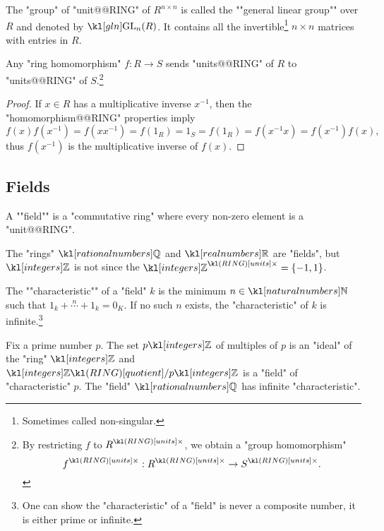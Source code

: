 \documentclass[main.tex]{subfiles}
\begin{document}
\begin{exmp}
	\AP The "group" of "unit@@RING" of $R^{n\times n}$ is called the ""general linear group"" over $R$ and denoted by $\gln(R)$. It contains all the invertible\footnote{Sometimes called non-singular.} $n\times n$ matrices with entries in $R$.
\end{exmp}
\begin{prop}
	Any "ring homomorphism" $f: R \rightarrow S$ sends "units@@RING" of $R$ to "units@@RING" of $S$.\footnote{By restricting $f$ to $\units{R}$, we obtain a "group homomorphism" \[\units{f}: \units{R} \rightarrow \units{S}.\]}
\end{prop}
\begin{proof}
	If $x \in R$ has a multiplicative inverse $x^{-1}$, then the "homomorphism@@RING" properties imply
	\[f(x)f(x^{-1}) = f(xx^{-1}) = f(1_R) = 1_S = f(1_R) = f(x^{-1}x) = f(x^{-1})f(x),\]
	thus $f(x^{-1})$ is the multiplicative inverse of $f(x)$.
\end{proof}
\subsection{Fields}
\begin{defn}[Field]
	\AP A ""field"" is a "commutative ring" where every non-zero element is a "unit@@RING".
\end{defn}
\begin{exmp}
	The "rings" $\Q$ and $\R$ are "fields", but $\Z$ is not since the $\units{\Z} = \{-1,1\}$.
\end{exmp}
\begin{defn}[Characteristic]
	\AP The ""characteristic"" of a "field" $k$ is the minimum $n \in \N$ such that $1_k+\stackrel{n}{\cdots} + 1_k = 0_K$. If no such $n$ exists, the "characteristic" of $k$ is infinite.\footnote{One can show the "characteristic" of a "field" is never a composite number, it is either prime or infinite.}
\end{defn}
\begin{exmps}
	Fix a prime number $p$. The set $p\Z$ of multiples of $p$ is an "ideal" of the "ring" $\Z$ and $\quotRING{\Z}{p\Z}$ is a "field" of "characteristic" $p$. The "field" $\Q$ has infinite "characteristic".
\end{exmps}
\end{document}
